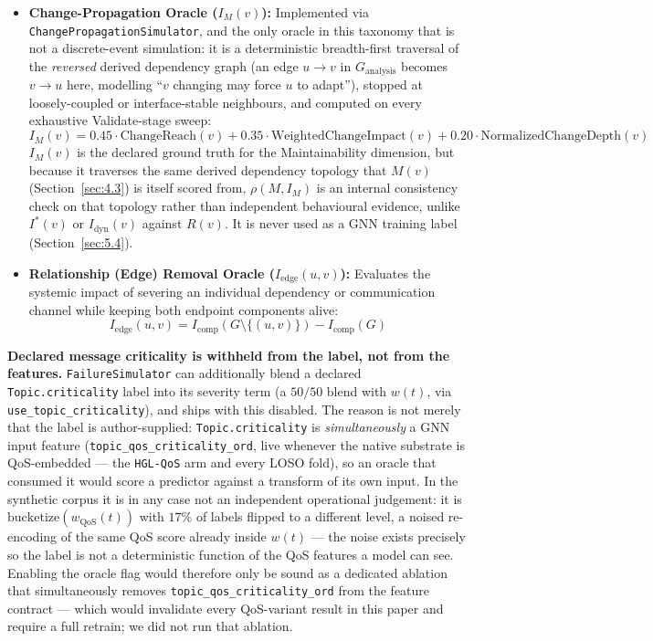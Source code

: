 \begin{itemize}
    \item \textbf{Change-Propagation Oracle ($I_M(v)$):} Implemented via \texttt{ChangePropagationSimulator}, and the only oracle in this taxonomy that is not a discrete-event simulation: it is a deterministic breadth-first traversal of the \emph{reversed} derived dependency graph (an edge $u \to v$ in $G_{\text{analysis}}$ becomes $v \to u$ here, modelling ``$v$ changing may force $u$ to adapt''), stopped at loosely-coupled or interface-stable neighbours, and computed on every exhaustive Validate-stage sweep:
    \begin{equation}
    I_M(v) = 0.45 \cdot \text{ChangeReach}(v) + 0.35 \cdot \text{WeightedChangeImpact}(v) + 0.20 \cdot \text{NormalizedChangeDepth}(v)
    \end{equation}
    $I_M(v)$ is the declared ground truth for the Maintainability dimension, but because it traverses the same derived dependency topology that $M(v)$ (Section~\ref{sec:4.3}) is itself scored from, $\rho(M, I_M)$ is an internal consistency check on that topology rather than independent behavioural evidence, unlike $I^*(v)$ or $I_{\text{dyn}}(v)$ against $R(v)$. It is never used as a GNN training label (Section~\ref{sec:5.4}).
    \item \textbf{Relationship (Edge) Removal Oracle ($I_{\text{edge}}(u,v)$):} Evaluates the systemic impact of severing an individual dependency or communication channel while keeping both endpoint components alive:
    \begin{equation}
    I_{\text{edge}}(u,v) = I_{\text{comp}}(G \setminus \{(u,v)\}) - I_{\text{comp}}(G)
    \end{equation}
\end{itemize}

\noindent\textbf{Declared message criticality is withheld from the label, not from the features.}
\texttt{FailureSimulator} can additionally blend a declared \texttt{Topic.criticality}
label into its severity term (a $50/50$ blend with $w(t)$, via \texttt{use\_topic\_criticality}),
and ships with this disabled. The reason is not merely that the label is author-supplied: \texttt{Topic.criticality}
is \emph{simultaneously} a GNN input feature (\texttt{topic\_qos\_criticality\_ord}, live whenever the
native substrate is QoS-embedded --- the \texttt{HGL-QoS} arm and every LOSO fold), so an oracle that
consumed it would score a predictor against a transform of its own input. In the synthetic corpus it is
in any case not an independent operational judgement: it is $\mathrm{bucketize}(w_{\text{QoS}}(t))$ with
$17\%$ of labels flipped to a different level, a noised re-encoding of the same QoS score already inside
$w(t)$ --- the noise exists precisely so the label is not a deterministic function of the QoS features a
model can see. Enabling the oracle flag would therefore only be sound as a dedicated ablation that
simultaneously removes \texttt{topic\_qos\_criticality\_ord} from the feature contract --- which would
invalidate every QoS-variant result in this paper and require a full retrain; we did not run that ablation.


